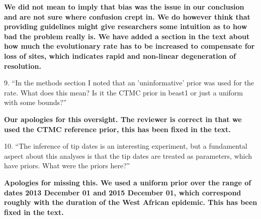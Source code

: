 \documentclass[11pt,oneside,letterpaper]{article}
\begin{document}
\textbf{We did not mean to imply that bias was the issue in our conclusion and are not sure where confusion crept in. We do however think that providing guidelines might give researchers some intuition as to how bad the problem really is. We have added a section in the text about how much the evolutionary rate has to be increased to compensate for loss of sites, which indicates rapid and non-linear degeneration of resolution.}

9. ``In the methods section I noted that an 'uninformative' prior was used for the rate. What does this mean? Is it the CTMC prior in beast1 or just a uniform with some bounds?''

\textbf{Our apologies for this oversight. The reviewer is correct in that we used the CTMC reference prior, this has been fixed in the text.}

10. ``The inference of tip dates is an interesting experiment, but a fundamental aspect about this analyses is that the tip dates are treated as parameters, which have priors. What were the priors here?''

\textbf{Apologies for missing this. We used a uniform prior over the range of dates 2013 December 01 and 2015 December 01, which correspond roughly with the duration of the West African epidemic. This has been fixed in the text.}
\end{document}
